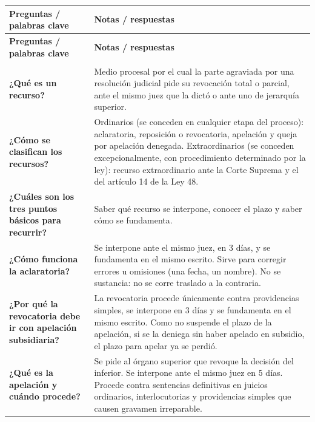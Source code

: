 \documentclass[12pt,oneside]{book}
\begin{document}
\begingroup
\renewcommand{\arraystretch}{1.25}
\begin{longtable}{
    >{\raggedright\arraybackslash}p{}
    >{\raggedright\arraybackslash}p{}
}
\toprule
\textbf{Preguntas / palabras clave} & \textbf{Notas / respuestas} \\
\midrule
\endfirsthead
\toprule
\textbf{Preguntas / palabras clave} & \textbf{Notas / respuestas} \\
\midrule
\endhead
\midrule
\multicolumn{2}{r}{\small contin\'ua en la p\'agina siguiente} \\
\endfoot
\bottomrule
\endlastfoot

\textbf{¿Qu\'e es un recurso?} &
Medio procesal por el cual la parte agraviada por una resoluci\'on judicial pide su revocaci\'on total o parcial, ante el mismo juez que la dict\'o o ante uno de jerarqu\'ia superior. \\[0.6em]

\textbf{¿C\'omo se clasifican los recursos?} &
Ordinarios (se conceden en cualquier etapa del proceso): aclaratoria, reposici\'on o revocatoria, apelaci\'on y queja por apelaci\'on denegada. Extraordinarios (se conceden excepcionalmente, con procedimiento determinado por la ley): recurso extraordinario ante la Corte Suprema y el del art\'iculo 14 de la Ley 48. \\[0.6em]

\textbf{¿Cu\'ales son los tres puntos b\'asicos para recurrir?} &
Saber qu\'e recurso se interpone, conocer el plazo y saber c\'omo se fundamenta. \\[0.6em]

\textbf{¿C\'omo funciona la aclaratoria?} &
Se interpone ante el mismo juez, en 3 d\'ias, y se fundamenta en el mismo escrito. Sirve para corregir errores u omisiones (una fecha, un nombre). No se sustancia: no se corre traslado a la contraria. \\[0.6em]

\textbf{¿Por qu\'e la revocatoria debe ir con apelaci\'on subsidiaria?} &
La revocatoria procede \'unicamente contra providencias simples, se interpone en 3 d\'ias y se fundamenta en el mismo escrito. Como no suspende el plazo de la apelaci\'on, si se la deniega sin haber apelado en subsidio, el plazo para apelar ya se perdi\'o. \\[0.6em]

\textbf{¿Qu\'e es la apelaci\'on y cu\'ando procede?} &
Se pide al \'organo superior que revoque la decisi\'on del inferior. Se interpone ante el mismo juez en 5 d\'ias. Procede contra sentencias definitivas en juicios ordinarios, interlocutorias y providencias simples que causen gravamen irreparable. \\[0.6em]


\end{longtable}
\end{document}
